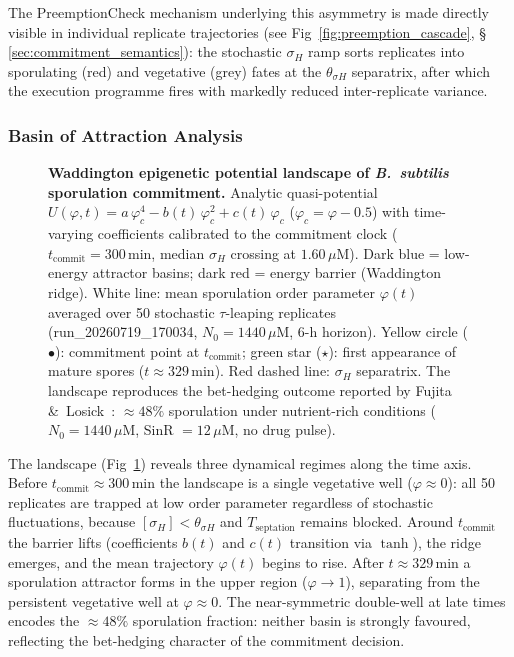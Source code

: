 \documentclass[10pt,letterpaper]{article}
\begin{document}
The PreemptionCheck mechanism underlying this asymmetry is made directly visible in individual replicate trajectories (see Fig~\ref{fig:preemption_cascade}, §\,\ref{sec:commitment_semantics}): the stochastic $\sigma_H$ ramp sorts replicates into sporulating (red) and vegetative (grey) fates at the $\theta_{\sigma H}$ separatrix, after which the execution programme fires with markedly reduced inter-replicate variance.

\subsubsection{Basin of Attraction Analysis}

\begin{figure}[!h]
    \caption{%
        \textbf{Waddington epigenetic potential landscape of \textit{B.~subtilis} sporulation commitment.}
        Analytic quasi-potential $U(\varphi,t) = a\,\varphi_c^4 - b(t)\,\varphi_c^2 + c(t)\,\varphi_c$
        ($\varphi_c = \varphi - 0.5$) with time-varying coefficients calibrated to the commitment clock ($t_{\mathrm{commit}} = 300\,\mathrm{min}$, median $\sigma_H$ crossing at $1.60\,\mu$M).
        Dark blue = low-energy attractor basins; dark red = energy barrier (Waddington ridge).
        White line: mean sporulation order parameter $\varphi(t)$ averaged over 50 stochastic $\tau$-leaping replicates (run\_20260719\_170034, $N_0 = 1440\,\mu$M, 6-h horizon).
        Yellow circle ($\bullet$): commitment point at $t_{\mathrm{commit}}$; green star ($\star$): first appearance of mature spores ($t \approx 329\,\mathrm{min}$).
        Red dashed line: $\sigma_H$ separatrix.
        The landscape reproduces the bet-hedging outcome reported by Fujita \&~Losick~\cite{fujita2005}: ${\approx}48\%$ sporulation under nutrient-rich conditions ($N_0 = 1440\,\mu$M, SinR $= 12\,\mu$M, no drug pulse).%
    }
    \label{fig:basin_attraction}
\end{figure}

The landscape (Fig~\ref{fig:basin_attraction}) reveals three dynamical regimes along the time axis. Before $t_{\mathrm{commit}} \approx 300\,\mathrm{min}$ the landscape is a single vegetative well ($\varphi \approx 0$): all 50 replicates are trapped at low order parameter regardless of stochastic fluctuations, because $[\sigma_H] < \theta_{\sigma H}$ and $T_{\mathrm{septation}}$ remains blocked. Around $t_{\mathrm{commit}}$ the barrier lifts (coefficients $b(t)$ and $c(t)$ transition via $\tanh$), the ridge emerges, and the mean trajectory $\varphi(t)$ begins to rise. After $t \approx 329\,\mathrm{min}$ a sporulation attractor forms in the upper region ($\varphi \to 1$), separating from the persistent vegetative well at $\varphi \approx 0$. The near-symmetric double-well at late times encodes the ${\approx}48\%$ sporulation fraction: neither basin is strongly favoured, reflecting the bet-hedging character of the commitment decision.
\end{document}
